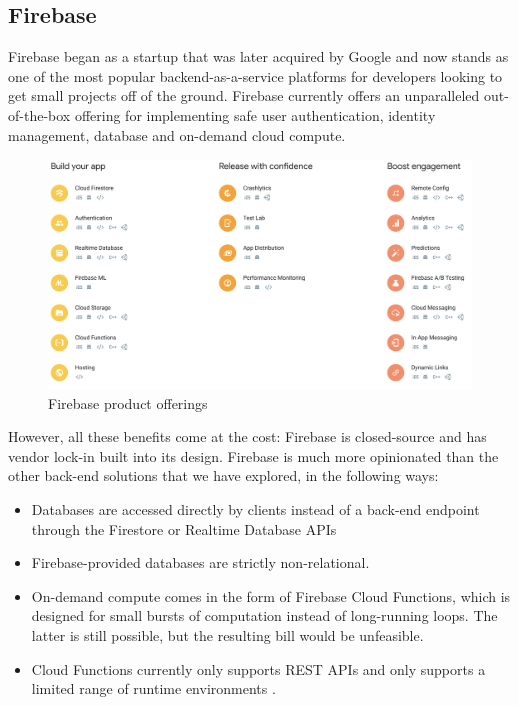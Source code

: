 \subsection{Firebase}
Firebase began as a startup that was later acquired by Google and now stands as one of the most popular backend-as-a-service platforms for developers looking to get small projects off of the ground. Firebase currently offers an unparalleled out-of-the-box offering for implementing safe user authentication, identity management, database and on-demand cloud compute.

\begin{figure}[h]
    \begin{center}
        \includegraphics[scale=0.3]{images/firebase_offerings.png}
    \end{center}
    \caption{Firebase product offerings}
    \label{firebase_compute_offerings}
\end{figure}

However, all these benefits come at the cost: Firebase is closed-source and has vendor lock-in built into its design. Firebase is much more opinionated than the other back-end solutions that we have explored, in the following ways:

\begin{itemize}
    \item Databases are accessed directly by clients instead of a back-end endpoint through the Firestore or Realtime Database APIs
    \item Firebase-provided databases are strictly non-relational.
    \item On-demand compute comes in the form of Firebase Cloud Functions, which is designed for small bursts of computation instead of long-running loops. The latter is still possible, but the resulting bill would be unfeasible.
    \item Cloud Functions currently only supports REST APIs and only supports a limited range of runtime environments \cite{TODO}.
\end{itemize}

